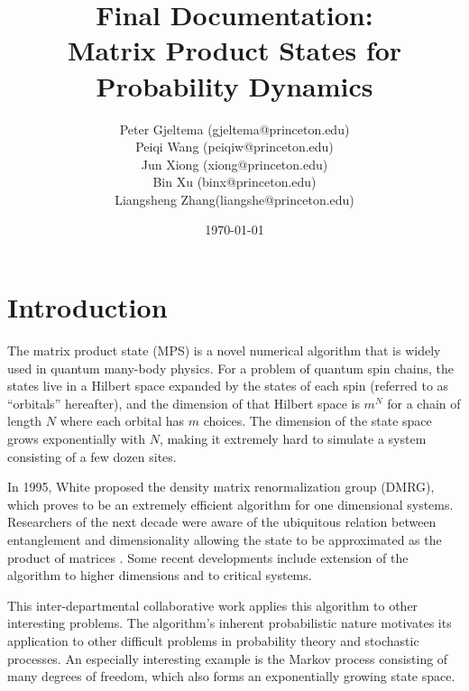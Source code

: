 \documentclass[english]{article}[12pt]
\begin{document}
\title{Final Documentation: \\Matrix Product States for Probability Dynamics}


\author{Peter Gjeltema (gjeltema@princeton.edu)
	   \\ Peiqi Wang (peiqiw@princeton.edu)
	    \\ Jun Xiong (xiong@princeton.edu) 
	    \\ Bin Xu (binx@princeton.edu) 
	    \\ Liangsheng Zhang(liangshe@princeton.edu)}
	    
\date{\today}

\maketitle

\section{Introduction}

The matrix product state (MPS) is a novel numerical algorithm that is
widely used in quantum many-body physics. For a problem of quantum
spin chains, the states live in a Hilbert space expanded by the states
of each spin (referred to as ``orbitals'' hereafter), and the dimension
of that Hilbert space is $m^{N}$ for a chain of length $N$ where each orbital has $m$ choices. 
The dimension of the state space
grows exponentially with $N$, making it extremely hard to simulate
a system consisting of a few dozen sites. 

In 1995, White \cite{white} proposed
the density matrix renormalization group (DMRG), which proves to be an extremely efficient algorithm for one dimensional systems. Researchers of the next decade were aware of the ubiquitous relation between entanglement and dimensionality allowing the state to be approximated as the product of matrices \cite{schollwock}. Some recent developments include extension of the algorithm to higher dimensions\cite{cirac} and to critical systems\cite{vidal}.

This inter-departmental collaborative work applies this algorithm to other interesting problems. The algorithm's inherent probabilistic nature motivates its application to other difficult problems in probability theory and stochastic processes. An especially interesting example is the Markov process consisting of many degrees of freedom, which also forms an exponentially growing state space. 
\end{document}
